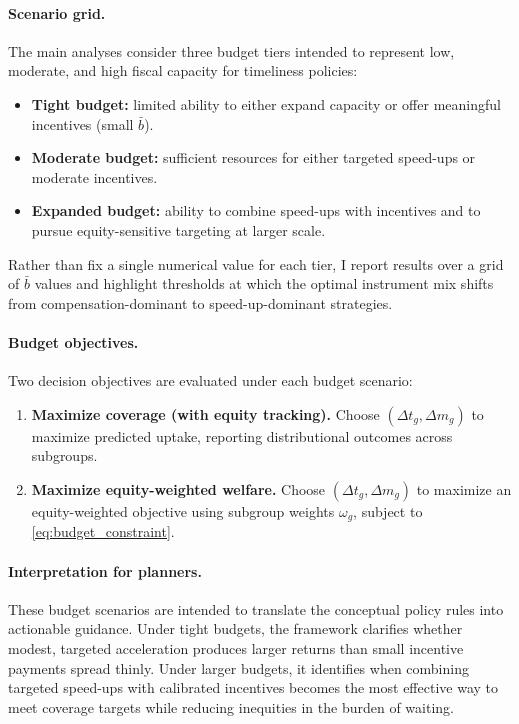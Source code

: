 \documentclass[doublespacing]{utdthesis}
\begin{document}
\paragraph{Scenario grid.}
The main analyses consider three budget tiers intended to represent low, moderate, and high fiscal capacity for timeliness policies:
\begin{itemize}[leftmargin=*]
\item \textbf{Tight budget:} limited ability to either expand capacity or offer meaningful incentives (small $\bar{b}$).
\item \textbf{Moderate budget:} sufficient resources for either targeted speed-ups or moderate incentives.
\item \textbf{Expanded budget:} ability to combine speed-ups with incentives and to pursue equity-sensitive targeting at larger scale.
\end{itemize}
Rather than fix a single numerical value for each tier, I report results over a grid of $\bar{b}$ values and highlight thresholds at which the optimal instrument mix shifts from compensation-dominant to speed-up-dominant strategies.

\paragraph{Budget objectives.}
Two decision objectives are evaluated under each budget scenario:
\begin{enumerate}[leftmargin=*]
\item \textbf{Maximize coverage (with equity tracking).} Choose $(\Delta t_g,\Delta m_g)$ to maximize predicted uptake, reporting distributional outcomes across subgroups.
\item \textbf{Maximize equity-weighted welfare.} Choose $(\Delta t_g,\Delta m_g)$ to maximize an equity-weighted objective using subgroup weights $\omega_g$, subject to \eqref{eq:budget_constraint}.
\end{enumerate}

\paragraph{Interpretation for planners.}
These budget scenarios are intended to translate the conceptual policy rules into actionable guidance. Under tight budgets, the framework clarifies whether modest, targeted acceleration produces larger returns than small incentive payments spread thinly. Under larger budgets, it identifies when combining targeted speed-ups with calibrated incentives becomes the most effective way to meet coverage targets while reducing inequities in the burden of waiting.
\end{document}
